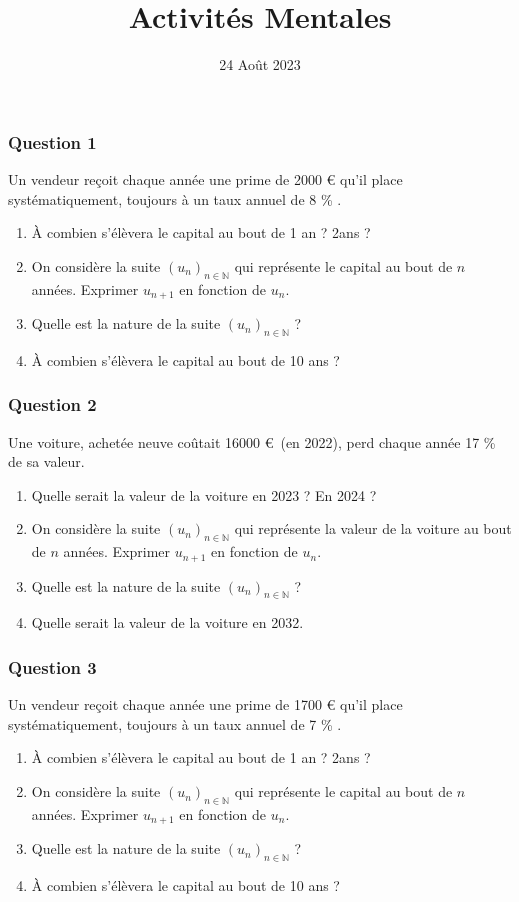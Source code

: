 \documentclass[15pt, mathserif]{beamer}
\title{Activités Mentales}
\date{24 Août 2023}
\newcommand{\N}{\mathbb{N}}			%
\newcommand{\st}[1]{$(#1_n)_{n \in \N}$}
\begin{document}
\begin{frame}
    \titlepage
\end{frame}

\begin{frame} 
	\frametitle{Question 1}
 Un vendeur reçoit chaque année une prime de  2000 \euro{} qu'il place systématiquement, toujours à un taux annuel de 8 \% . 
 \begin{enumerate} 
 	 \item À combien s'élèvera le capital au bout de 1 an ? 2ans ?  
 	 \item On considère la suite \st{u} qui représente le capital au bout de $n$ années. Exprimer $u_{n+1}$ en fonction de $u_n$. 
 	 \item Quelle est la nature de la suite \st{u} ? 
 	 \item  À combien s'élèvera le capital au bout de 10 ans ? 
 \end{enumerate} \end{frame}


\begin{frame} 
	\frametitle{Question 2}
 Une voiture, achetée neuve coûtait 16000 \euro ~(en 2022), perd chaque année  17 \% de sa valeur. 
 \begin{enumerate} 
 	 \item Quelle serait la valeur de la voiture en 2023 ? En 2024 ? 
 	 \item On considère la suite \st{u} qui représente la valeur de la voiture au bout de $n$ années. Exprimer $u_{n+1}$ en fonction de $u_n$. 
 	 \item Quelle est la nature de la suite \st{u} ?
 	 \item Quelle serait la valeur de la voiture en 2032. 
 \end{enumerate} \end{frame}


\begin{frame} 
	\frametitle{Question 3}
 Un vendeur reçoit chaque année une prime de  1700 \euro{} qu'il place systématiquement, toujours à un taux annuel de 7 \% . 
 \begin{enumerate} 
 	 \item À combien s'élèvera le capital au bout de 1 an ? 2ans ?  
 	 \item On considère la suite \st{u} qui représente le capital au bout de $n$ années. Exprimer $u_{n+1}$ en fonction de $u_n$. 
 	 \item Quelle est la nature de la suite \st{u} ? 
 	 \item  À combien s'élèvera le capital au bout de 10 ans ? 
 \end{enumerate} \end{frame}
\end{document}
